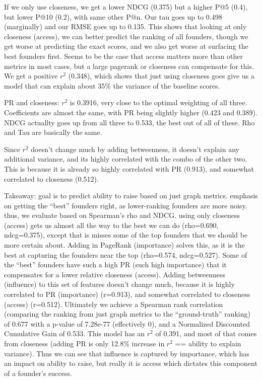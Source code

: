 If we only use closeness, we get a lower NDCG (0.375) but a higher P@5 (0.4), but lower P@10 (0.2), with same other P@n. Our tau goes up to 0.498 (marginally) and our RMSE goes up to 0.135. This shows that looking at only closeness (access), we can better predict the ranking of all founders, though we get worse at predicting the exact scores, and we also get worse at surfacing the best founders first. Seems to be the case that access matters more than other metrics in most cases, but a large pagerank or closeness can compensate for this. We get a positive $r^2$ (0.348), which shows that just using closeness goes give us a model that can explain about 35\% the variance of the baseline scores.

PR and closeness: $r^2$ is 0.3916, very close to the optimal weighting of all three. Coefficients are almost the same, with PR being slightly higher (0.423 and 0.389). NDCG actuallty goes up from all three to 0.533, the best out of all of these. Rho and Tau are basically the same.

Since $r^2$ doesn't change much by adding betweenness, it doesn't explain any additional variance, and its highly correlated with the combo of the other two. This is because it is already so highly correlated with PR (0.913), and somewhat correlated to closeness (0.512).

Takeaway: goal is to predict ability to raise based on just graph metrics. emphasis on getting the ``best'' founders right, as lower-ranking founders are more noisy. thus, we evaluate based on Spearman's rho and NDCG. using only closeness (access) gets us almost all the way to the best we can do (rho=0.690, ndcg=0.375), except that is misses some of the top founders that we should be more certain about. Adding in PageRank (importance) solves this, as it is the best at capturing the founders near the top (rho=0.574, ndcg=0.527). Some of the ``best'' founders have such a high PR (such high importance) that it compensates for a lower relative closeness (access). Adding betweenness (influence) to this set of features doesn't change much, because it is highly correlated to PR (importance) (r=0.913), and somewhat correlated to closeness (access) (r=0.512). Ultimately we achieve a Spearman rank correlation (comparing the ranking from just graph metrics to the ``ground-truth'' ranking) of 0.677 with a p-value of 7.28e-77 (effectively 0), and a Normalized Discounted Cumulative Gain of 0.533. This model has an $r^2$ of 0.391, and most of that comes from closeness (adding PR is only 12.8\% increase in $r^2$ == ability to explain variance). Thus we can see that influence is captured by importance, which has an impact on ability to raise, but really it is access which dictates this component of a founder's success.

